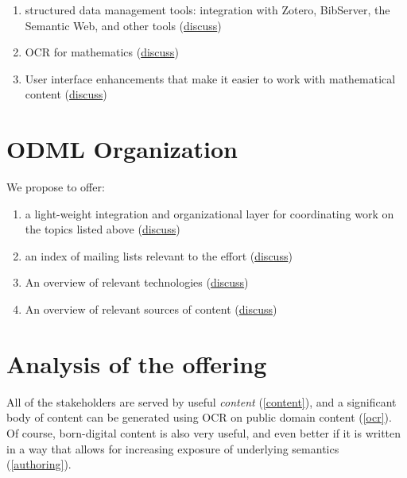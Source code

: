 \documentclass{article}
\begin{document}
\begin{enumerate}
\item\label{data} structured data management tools: integration with Zotero, BibServer, the Semantic Web, and other tools (\href{https://github.com/holtzermann17/skelodml/wiki/J.-structured-data-management-tools}{discuss})
\item\label{ocr} OCR for mathematics (\href{https://github.com/holtzermann17/skelodml/wiki/K.-OCR-for-mathematics}{discuss})
\item\label{ui} User interface enhancements that make it easier to work with mathematical content (\href{https://github.com/holtzermann17/skelodml/wiki/L.-UI-enhancements}{discuss})
\end{enumerate}

\section{ODML Organization}

We propose to offer:

\begin{enumerate}
\item\label{integration} a light-weight integration and organizational layer for coordinating work on the topics listed above (\href{https://github.com/holtzermann17/skelodml/wiki/1.-Home}{discuss})
\item\label{mail} an index of mailing lists relevant to the effort (\href{https://github.com/holtzermann17/skelodml/wiki/2.-Mailing-lists}{discuss})
\item\label{technology} An overview of relevant technologies (\href{https://github.com/holtzermann17/skelodml/wiki/3.-Technology-overview}{discuss})
\item\label{content} An overview of relevant sources of content (\href{https://github.com/holtzermann17/skelodml/wiki/4.-Content-overview}{discuss})
\end{enumerate}

\section{Analysis of the offering}

All of the stakeholders are served by useful \emph{content} (\ref{content}), and a significant body of content can be generated using OCR on public domain content (\ref{ocr}).  Of course, born-digital content is also very useful, and even better if it is written in a way that allows for increasing exposure of underlying semantics (\ref{authoring}).
\end{document}

